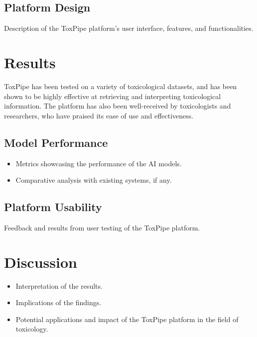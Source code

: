 \documentclass[
  super,
  preprint,
  5p,
  twocolumn]{elsarticle}
\providecommand{\tightlist}{%
  \setlength{\itemsep}{0pt}\setlength{\parskip}{0pt}}\usepackage{longtable,booktabs,array}
\begin{document}
\hypertarget{platform-design}{%
\subsection{Platform Design}\label{platform-design}}

Description of the ToxPipe platform's user interface, features, and
functionalities.

\hypertarget{results}{%
\section{Results}\label{results}}

ToxPipe has been tested on a variety of toxicological datasets, and has
been shown to be highly effective at retrieving and interpreting
toxicological information. The platform has also been well-received by
toxicologists and researchers, who have praised its ease of use and
effectiveness.

\hypertarget{model-performance}{%
\subsection{Model Performance}\label{model-performance}}

\begin{itemize}
\tightlist
\item
  Metrics showcasing the performance of the AI models.
\item
  Comparative analysis with existing systems, if any.
\end{itemize}

\hypertarget{platform-usability}{%
\subsection{Platform Usability}\label{platform-usability}}

Feedback and results from user testing of the ToxPipe platform.

\hypertarget{discussion}{%
\section{Discussion}\label{discussion}}

\begin{itemize}
\tightlist
\item
  Interpretation of the results.
\item
  Implications of the findings.
\item
  Potential applications and impact of the ToxPipe platform in the field
  of toxicology.
\end{itemize}
\end{document}
